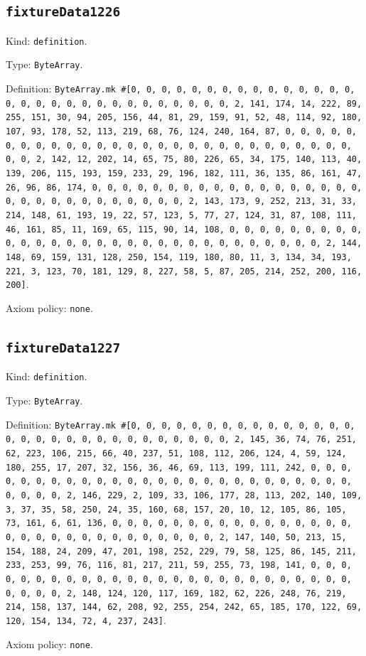\documentclass[11pt]{article}
\begin{document}
\subsection*{\texttt{fixtureData1226}}
\noindent Kind: \texttt{definition}.\par
\noindent Type: \texttt{ByteArray}.\par
\noindent Definition: \texttt{ByteArray.mk \#[0, 0, 0, 0, 0, 0, 0, 0, 0, 0, 0, 0, 0, 0, 0, 0, 0, 0, 0, 0, 0, 0, 0, 0, 0, 0, 0, 0, 0, 0, 2, 141, 174, 14, 222, 89, 255, 151, 30, 94, 205, 156, 44, 81, 29, 159, 91, 52, 48, 114, 92, 180, 107, 93, 178, 52, 113, 219, 68, 76, 124, 240, 164, 87, 0, 0, 0, 0, 0, 0, 0, 0, 0, 0, 0, 0, 0, 0, 0, 0, 0, 0, 0, 0, 0, 0, 0, 0, 0, 0, 0, 0, 0, 0, 2, 142, 12, 202, 14, 65, 75, 80, 226, 65, 34, 175, 140, 113, 40, 139, 206, 115, 193, 159, 233, 29, 196, 182, 111, 36, 135, 86, 161, 47, 26, 96, 86, 174, 0, 0, 0, 0, 0, 0, 0, 0, 0, 0, 0, 0, 0, 0, 0, 0, 0, 0, 0, 0, 0, 0, 0, 0, 0, 0, 0, 0, 0, 0, 2, 143, 173, 9, 252, 213, 31, 33, 214, 148, 61, 193, 19, 22, 57, 123, 5, 77, 27, 124, 31, 87, 108, 111, 46, 161, 85, 11, 169, 65, 115, 90, 14, 108, 0, 0, 0, 0, 0, 0, 0, 0, 0, 0, 0, 0, 0, 0, 0, 0, 0, 0, 0, 0, 0, 0, 0, 0, 0, 0, 0, 0, 0, 0, 2, 144, 148, 69, 159, 131, 128, 250, 154, 119, 180, 80, 11, 3, 134, 34, 193, 221, 3, 123, 70, 181, 129, 8, 227, 58, 5, 87, 205, 214, 252, 200, 116, 200]}.\par
\noindent Axiom policy: \texttt{none}.\par
\subsection*{\texttt{fixtureData1227}}
\noindent Kind: \texttt{definition}.\par
\noindent Type: \texttt{ByteArray}.\par
\noindent Definition: \texttt{ByteArray.mk \#[0, 0, 0, 0, 0, 0, 0, 0, 0, 0, 0, 0, 0, 0, 0, 0, 0, 0, 0, 0, 0, 0, 0, 0, 0, 0, 0, 0, 0, 0, 2, 145, 36, 74, 76, 251, 62, 223, 106, 215, 66, 40, 237, 51, 108, 112, 206, 124, 4, 59, 124, 180, 255, 17, 207, 32, 156, 36, 46, 69, 113, 199, 111, 242, 0, 0, 0, 0, 0, 0, 0, 0, 0, 0, 0, 0, 0, 0, 0, 0, 0, 0, 0, 0, 0, 0, 0, 0, 0, 0, 0, 0, 0, 0, 2, 146, 229, 2, 109, 33, 106, 177, 28, 113, 202, 140, 109, 3, 37, 35, 58, 250, 24, 35, 160, 68, 157, 20, 10, 12, 105, 86, 105, 73, 161, 6, 61, 136, 0, 0, 0, 0, 0, 0, 0, 0, 0, 0, 0, 0, 0, 0, 0, 0, 0, 0, 0, 0, 0, 0, 0, 0, 0, 0, 0, 0, 0, 0, 2, 147, 140, 50, 213, 15, 154, 188, 24, 209, 47, 201, 198, 252, 229, 79, 58, 125, 86, 145, 211, 233, 253, 99, 76, 116, 81, 217, 211, 59, 255, 73, 198, 141, 0, 0, 0, 0, 0, 0, 0, 0, 0, 0, 0, 0, 0, 0, 0, 0, 0, 0, 0, 0, 0, 0, 0, 0, 0, 0, 0, 0, 0, 0, 2, 148, 124, 120, 117, 169, 182, 62, 226, 248, 76, 219, 214, 158, 137, 144, 62, 208, 92, 255, 254, 242, 65, 185, 170, 122, 69, 120, 154, 134, 72, 4, 237, 243]}.\par
\noindent Axiom policy: \texttt{none}.\par
\end{document}
